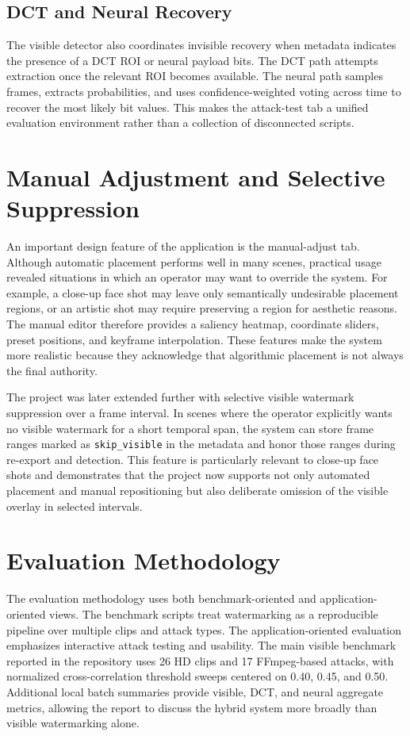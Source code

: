 \documentclass[12pt,oneside]{report}
\begin{document}
\subsection{DCT and Neural Recovery}
The visible detector also coordinates invisible recovery when metadata indicates the presence of a DCT ROI or neural payload bits. The DCT path attempts extraction once the relevant ROI becomes available. The neural path samples frames, extracts probabilities, and uses confidence-weighted voting across time to recover the most likely bit values. This makes the attack-test tab a unified evaluation environment rather than a collection of disconnected scripts.

\section{Manual Adjustment and Selective Suppression}
An important design feature of the application is the manual-adjust tab. Although automatic placement performs well in many scenes, practical usage revealed situations in which an operator may want to override the system. For example, a close-up face shot may leave only semantically undesirable placement regions, or an artistic shot may require preserving a region for aesthetic reasons. The manual editor therefore provides a saliency heatmap, coordinate sliders, preset positions, and keyframe interpolation. These features make the system more realistic because they acknowledge that algorithmic placement is not always the final authority.

The project was later extended further with selective visible watermark suppression over a frame interval. In scenes where the operator explicitly wants no visible watermark for a short temporal span, the system can store frame ranges marked as \texttt{skip\_visible} in the metadata and honor those ranges during re-export and detection. This feature is particularly relevant to close-up face shots and demonstrates that the project now supports not only automated placement and manual repositioning but also deliberate omission of the visible overlay in selected intervals.

\section{Evaluation Methodology}
The evaluation methodology uses both benchmark-oriented and application-oriented views. The benchmark scripts treat watermarking as a reproducible pipeline over multiple clips and attack types. The application-oriented evaluation emphasizes interactive attack testing and usability. The main visible benchmark reported in the repository uses 26 HD clips and 17 FFmpeg-based attacks, with normalized cross-correlation threshold sweeps centered on 0.40, 0.45, and 0.50. Additional local batch summaries provide visible, DCT, and neural aggregate metrics, allowing the report to discuss the hybrid system more broadly than visible watermarking alone.
\end{document}
